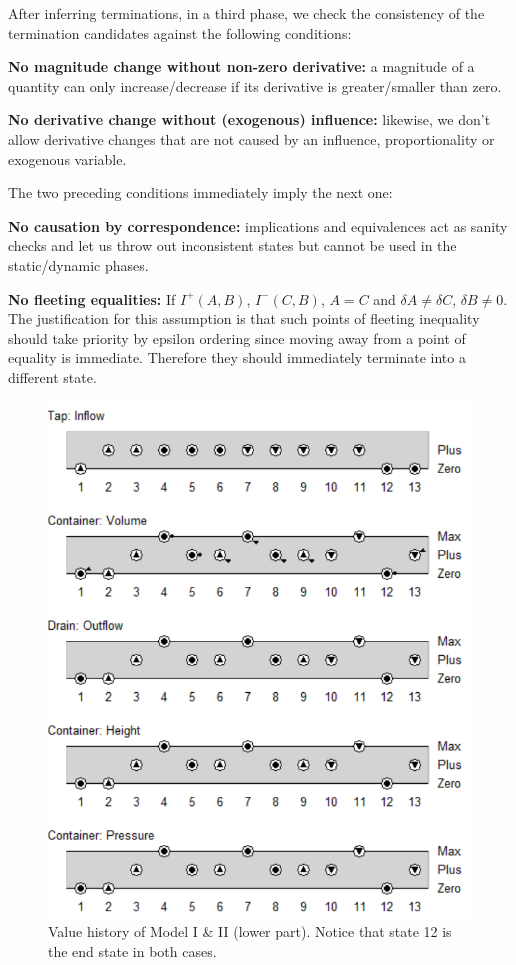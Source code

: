 \documentclass{article}
\begin{document}
After inferring terminations, in a third phase, we check the consistency of the termination candidates against the following conditions:

\textbf{No magnitude change without non-zero derivative:} a magnitude of a quantity can only increase/decrease if its derivative is greater/smaller than zero. 

\textbf{No derivative change without (exogenous) influence:} likewise, we don't allow derivative changes that are not caused by an influence, proportionality or exogenous variable. 

\noindent The two preceding conditions immediately imply the next one:

\textbf{No causation by correspondence:} implications and equivalences act as sanity checks and let us throw out inconsistent states but cannot be used in the static/dynamic phases.

\textbf{No fleeting equalities:} If $I^+(A,B)$, $I^-(C,B)$, $A=C$ and $\delta A \neq \delta C$, $\delta B \neq 0$. The justification for this assumption is that such points of fleeting inequality should take priority by epsilon ordering since moving away from a point of equality is immediate. Therefore they should immediately terminate into a different state.

\begin{figure}[!h]
	\includegraphics{Value_History_Extra}
	\caption{Value history of Model I \& II (lower part). Notice that state 12 is the end state in both cases.}
	\label{figure9}
\end{figure}
\end{document}
